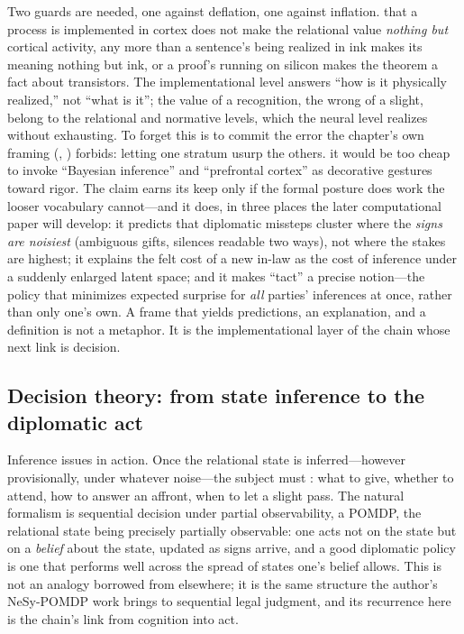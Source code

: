 Two guards are needed, one against deflation, one against inflation.  that a process is implemented in cortex does not make the relational value \emph{nothing but} cortical activity, any more than a sentence's being realized in ink makes its meaning nothing but ink, or a proof's running on silicon makes the theorem a fact about transistors. The implementational level answers ``how is it physically realized,'' not ``what is it''; the value of a recognition, the wrong of a slight, belong to the relational and normative levels, which the neural level realizes without exhausting. To forget this is to commit the error the chapter's own framing (, ) forbids: letting one stratum usurp the others.  it would be too cheap to invoke ``Bayesian inference'' and ``prefrontal cortex'' as decorative gestures toward rigor. The claim earns its keep only if the formal posture does work the looser vocabulary cannot---and it does, in three places the later computational paper will develop: it predicts that diplomatic missteps cluster where the \emph{signs are noisiest} (ambiguous gifts, silences readable two ways), not where the stakes are highest; it explains the felt cost of a new in-law as the cost of inference under a suddenly enlarged latent space; and it makes ``tact'' a precise notion---the policy that minimizes expected surprise for \emph{all} parties' inferences at once, rather than only one's own. A frame that yields predictions, an explanation, and a definition is not a metaphor. It is the implementational layer of the chain whose next link is decision.

\subsection{Decision theory: from state inference to the diplomatic act}
Inference issues in action. Once the relational state is inferred---however provisionally, under whatever noise---the subject must : what to give, whether to attend, how to answer an affront, when to let a slight pass. The natural formalism is sequential decision under partial observability, a POMDP, the relational state being precisely partially observable: one acts not on the state but on a \emph{belief} about the state, updated as signs arrive, and a good diplomatic policy is one that performs well across the spread of states one's belief allows. This is not an analogy borrowed from elsewhere; it is the same structure the author's NeSy-POMDP work brings to sequential legal judgment, and its recurrence here is the chain's link from cognition into act.

